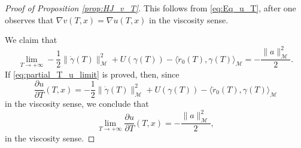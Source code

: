 \documentclass[a4paper,10pt]{amsart}
\theoremstyle{plain}
\theoremstyle{definition}
\numberwithin{equation}{section}
\numberwithin{thm}{section}
\begin{document}
\begin{proof}[Proof of Proposition \ref{prop:HJ_v_T}]

    This follows from \eqref{eq:Eq_u_T}, after one observes that $\nabla v(T,x)=\nabla u(T,x)$ in the viscosity sense.

We claim that
\begin{equation}
    \label{eq:partial_T_u_limit}
\lim_{T\rightarrow+\infty} -\frac{1}{2}\|\dot{\gamma}(T)\|_\mathcal{M}^2 + U(\gamma(T)) - \langle \ddot{r}_0(T),\gamma(T)\rangle_\mathcal{M} = -\frac{\|a\|_\mathcal{M}^2}{2}.
\end{equation}
If \eqref{eq:partial_T_u_limit} is proved, then, since
\[
\frac{\partial u}{\partial T}(T,x)=-\frac{1}{2}\|\dot{\gamma}(T)\|_\mathcal{M}^2 + U(\gamma(T)) - \langle \ddot{r}_0(T),\gamma(T)\rangle_\mathcal{M}
\]
in the viscosity sense, we conclude that
\[
\lim_{T\to +\infty}\frac{\partial u}{\partial T}(T,x)=-\frac{\|a\|_\mathcal{M}^2}{2},
\]
in the viscosity sense.


\end{proof}
\end{document}
